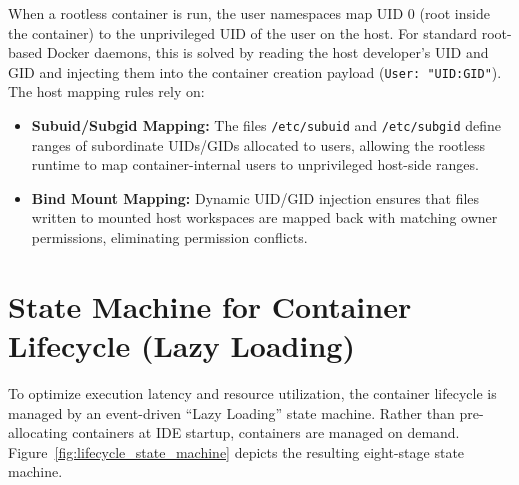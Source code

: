 When a rootless container is run, the user namespaces map UID 0 (root inside the container) to the unprivileged UID of the user on the host. For standard root-based Docker daemons, this is solved by reading the host developer's UID and GID and injecting them into the container creation payload (\texttt{User: "UID:GID"}). The host mapping rules rely on:
\begin{itemize}
    \item \textbf{Subuid/Subgid Mapping:} The files \texttt{/etc/subuid} and \texttt{/etc/subgid} define ranges of subordinate UIDs/GIDs allocated to users, allowing the rootless runtime to map container-internal users to unprivileged host-side ranges.
    \item \textbf{Bind Mount Mapping:} Dynamic UID/GID injection ensures that files written to mounted host workspaces are mapped back with matching owner permissions, eliminating permission conflicts.
\end{itemize}

\section{State Machine for Container Lifecycle (Lazy Loading)}
To optimize execution latency and resource utilization, the container lifecycle is managed by an event-driven ``Lazy Loading'' state machine. Rather than pre-allocating containers at IDE startup, containers are managed on demand. Figure~\ref{fig:lifecycle_state_machine} depicts the resulting eight-stage state machine.

